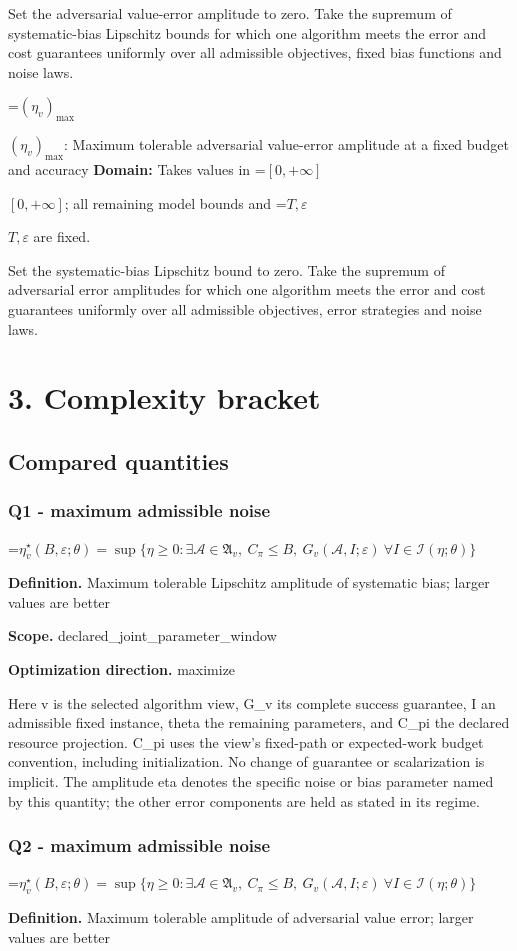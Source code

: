 \documentclass[10pt,a4paper]{article}
\newcommand{\AtlasMath}[1]{\par\begingroup\centering\setbox0=\hbox{$\displaystyle #1$}\ifdim\wd0>1.4\linewidth\typeout{ATLAS WIDE FORMULA: \the\wd0}\fi\ifdim\wd0>\linewidth\resizebox{\linewidth}{!}{\box0}\else\box0\fi\par\endgroup}
\newcommand{\AtlasInlineMath}[1]{\begingroup\setbox0=\hbox{$#1$}\ifdim\wd0>.4\linewidth\endgroup\AtlasMath{#1}\else\endgroup$#1$\fi}
\begin{document}
Set the adversarial value-error amplitude to zero. Take the supremum of systematic-bias Lipschitz bounds for which one algorithm meets the error and cost guarantees uniformly over all admissible objectives, fixed bias functions and noise laws.

\AtlasInlineMath{(\eta_v)_{\max}}: Maximum tolerable adversarial value-error amplitude at a fixed budget and accuracy \textbf{Domain:} Takes values in \AtlasInlineMath{[0,+\infty]}; all remaining model bounds and \AtlasInlineMath{T,\varepsilon} are fixed.

Set the systematic-bias Lipschitz bound to zero. Take the supremum of adversarial error amplitudes for which one algorithm meets the error and cost guarantees uniformly over all admissible objectives, error strategies and noise laws.

\section{3. Complexity bracket}
\subsection{Compared quantities}
\subsubsection{Q1 - maximum admissible noise}
\AtlasMath{\eta^\star_v(B,\varepsilon;\theta)=\sup\{\eta\ge0:\exists\mathcal A\in\mathfrak A_v,\ C_\pi\le B,\ G_v(\mathcal A,I;\varepsilon)\ \forall I\in\mathcal I(\eta;\theta)\}}
\textbf{Definition.} Maximum tolerable Lipschitz amplitude of systematic bias; larger values are better

\textbf{Scope.} declared\_joint\_parameter\_window

\textbf{Optimization direction.} maximize

Here v is the selected algorithm view, G\_v its complete success guarantee, I an admissible fixed instance, theta the remaining parameters, and C\_pi the declared resource projection. C\_pi uses the view's fixed-path or expected-work budget convention, including initialization. No change of guarantee or scalarization is implicit. The amplitude eta denotes the specific noise or bias parameter named by this quantity; the other error components are held as stated in its regime.

\subsubsection{Q2 - maximum admissible noise}
\AtlasMath{\eta^\star_v(B,\varepsilon;\theta)=\sup\{\eta\ge0:\exists\mathcal A\in\mathfrak A_v,\ C_\pi\le B,\ G_v(\mathcal A,I;\varepsilon)\ \forall I\in\mathcal I(\eta;\theta)\}}
\textbf{Definition.} Maximum tolerable amplitude of adversarial value error; larger values are better
\end{document}
